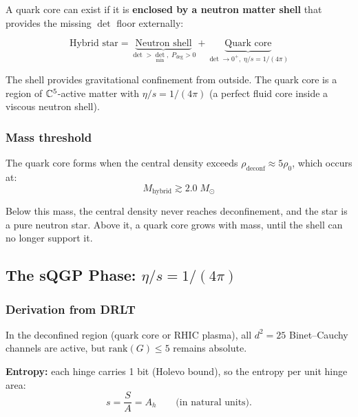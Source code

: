 A quark core can exist if it is \textbf{enclosed by a neutron matter shell} that provides the missing $\det$ floor externally:

\begin{equation}
\text{Hybrid star} = \underbrace{\text{Neutron shell}}_{\det > \det_\text{min},\; P_\text{deg} > 0} + \underbrace{\text{Quark core}}_{\det \to 0^+,\; \eta/s = 1/(4\pi)}
\end{equation}

The shell provides gravitational confinement from outside. The quark core is a region of $\mathbb{C}^5$-active matter with $\eta/s = 1/(4\pi)$ (a perfect fluid core inside a viscous neutron shell).

\subsubsection{Mass threshold}

The quark core forms when the central density exceeds $\rho_\text{deconf} \approx 5\rho_0$, which occurs at:
\begin{equation}
M_\text{hybrid} \gtrsim 2.0\;M_\odot
\end{equation}

Below this mass, the central density never reaches deconfinement, and the star is a pure neutron star. Above it, a quark core grows with mass, until the shell can no longer support it.

\subsection{The sQGP Phase: $\eta/s = 1/(4\pi)$}

\subsubsection{Derivation from DRLT}

In the deconfined region (quark core or RHIC plasma), all $d^2 = 25$ Binet--Cauchy channels are active, but $\text{rank}(G) \leq 5$ remains absolute.

\textbf{Entropy:} each hinge carries 1 bit (Holevo bound), so the entropy per unit hinge area:
\begin{equation}
s = \frac{S}{A} = A_h \qquad \text{(in natural units)}.
\end{equation}

